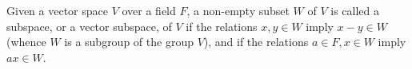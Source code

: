 Given a vector space $V$ over a field $F$, a non-empty subset $W$ of $V$ is called a subspace, or a vector subspace, of $V$ if the relations $x, y \in W$ imply $x - y \in W$ (whence $W$ is a subgroup of the group $V$), and if the relations $a \in F, x \in W$ imply $ax \in W$.
